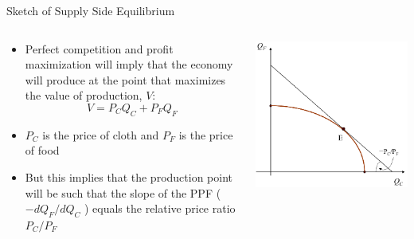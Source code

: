 \documentclass[10pt,hyperref={CJKbookmarks=true},xcolor=dvipsnames,aspectratio=169]{beamer}
\begin{document}
\begin{frame}{Sketch of Supply Side Equilibrium }


\begin{columns}[onlytextwidth]
\begin{column}{0.5\textwidth}
\begin{itemize}
\item Perfect competition and profit maximization will imply that the economy
will produce at the point that maximizes the value of production,
$V$: 
\[
V=P_{C}Q_{C}+P_{F}Q_{F}
\]
 
\item $P_{C}$ is the price of cloth and $P_{F}$ is the price of food 
\item But this implies that the production point will be such that the slope
of the PPF ($-dQ_{F}/dQ_{C}$ ) equals the relative price ratio $P_{C}/P_{F}$ 
\end{itemize}

\end{column}
\begin{column}{0.5\textwidth}
\centering \includegraphics[width=0.7\columnwidth]{fig/sfm/lec4-9}
\end{column}
\end{columns}

\end{frame}
\end{document}
